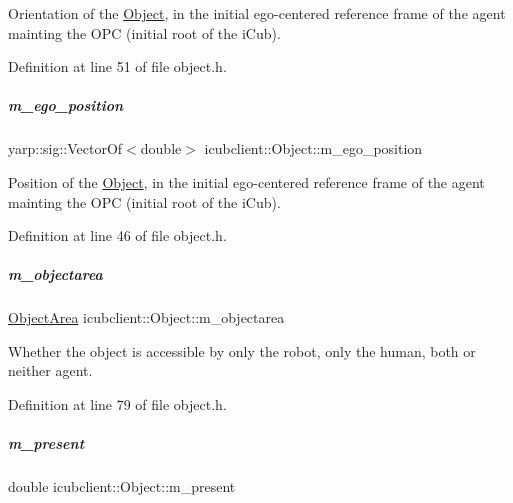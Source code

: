 Orientation of the \hyperlink{group__icubclient__representations_classicubclient_1_1Object}{Object}, in the initial ego-\/centered reference frame of the agent mainting the O\+PC (initial root of the i\+Cub). 



Definition at line 51 of file object.\+h.

\mbox{\label{group__icubclient__representations_a060b41eb669e6fc344fda352c3f63feb}} 
\subparagraph{\texorpdfstring{m\+\_\+ego\+\_\+position}{m\_ego\_position}}
{\footnotesize\ttfamily yarp\+::sig\+::\+Vector\+Of$<$double$>$ icubclient\+::\+Object\+::m\+\_\+ego\+\_\+position}



Position of the \hyperlink{group__icubclient__representations_classicubclient_1_1Object}{Object}, in the initial ego-\/centered reference frame of the agent mainting the O\+PC (initial root of the i\+Cub). 



Definition at line 46 of file object.\+h.

\mbox{\label{group__icubclient__representations_a762c490f385f69ba71c522d4eb9c1e9d}} 
\subparagraph{\texorpdfstring{m\+\_\+objectarea}{m\_objectarea}}
{\footnotesize\ttfamily \hyperlink{namespaceicubclient_a582031d3e105cc59d614d15d30d22e65}{Object\+Area} icubclient\+::\+Object\+::m\+\_\+objectarea}



Whether the object is accessible by only the robot, only the human, both or neither agent. 



Definition at line 79 of file object.\+h.

\mbox{\label{group__icubclient__representations_a2a4dbbc7b70e2cc2d81b4f519493ffe6}} 
\subparagraph{\texorpdfstring{m\+\_\+present}{m\_present}}
{\footnotesize\ttfamily double icubclient\+::\+Object\+::m\+\_\+present}




